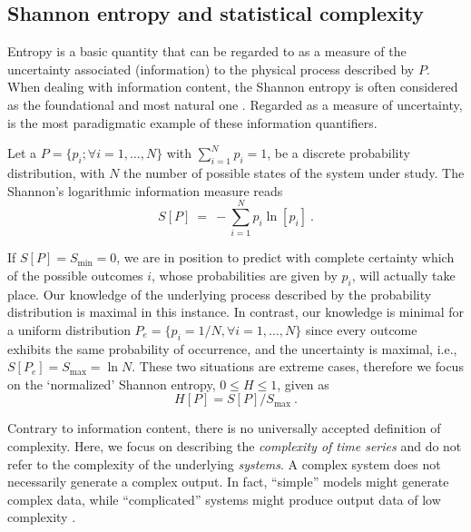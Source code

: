 \subsection{Shannon entropy and statistical complexity}

Entropy is a basic quantity that can be regarded to as a measure of the uncertainty associated (information) to the physical process described by $P$.
When dealing with information content, the Shannon entropy is often considered as the foundational and most natural one \cite{Shannon1948,Weaver1949}.
Regarded as a measure of uncertainty, is the most paradigmatic example of these information quantifiers.

Let a $P=\{p_i; \forall i=1,\ldots, N\}$ with $\sum_{i=1}^N p_i = 1$, be a discrete probability distribution, with $N$ the number of possible states of the system under study.
The Shannon's logarithmic information measure reads
\begin{equation}
\label{Shannon-disc}
S[P] ~=~ -\sum_{i=1}^{N} p_i \ln \left[ p_i \right] \ .
\end{equation}

If $S[P] = S_{\min} = 0$, we are in position to predict with complete certainty which of the possible outcomes $i$, whose probabilities are given by $p_i$, will actually take place. 
Our knowledge of the underlying process described by the probability distribution is maximal in this instance. 
In contrast, our knowledge is minimal for a uniform distribution $P_e = \{ p_i = 1/N, \forall i=1, \ldots , N \}$ since every outcome exhibits the same probability of occurrence, and the uncertainty is maximal, i.e., $S[P_e] = S_{\max} = \ln N$.
These two situations are extreme cases, therefore we focus on the `normalized' Shannon entropy, $0 \leq H \leq 1$, given as
\begin{equation}
\label{shannon-disc-normalizada}
H[P] = S[P] / S_{\max} \ .
\end{equation}

Contrary to information content, there is no universally accepted definition of complexity.
Here, we focus on describing the \textit{complexity of time series} and do not refer to the complexity of the underlying \textit{systems}.
A complex system does not necessarily generate a complex output.
In fact, “simple” models might generate complex data, while “complicated” systems might produce output data of low complexity \cite{Kantz1998}.

